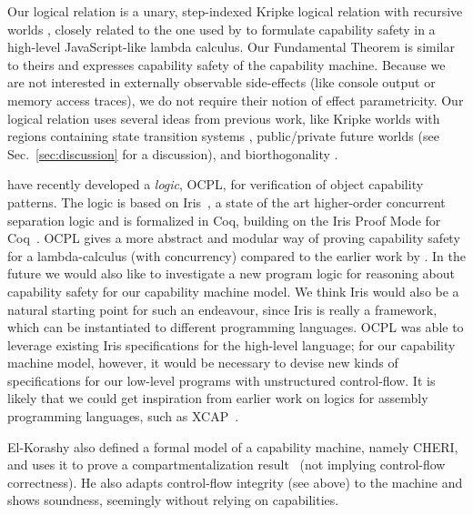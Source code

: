 \documentclass{llncs}
\newcommand{\sectionname}{Sec.}
\begin{document}
Our logical relation is a unary, step-indexed Kripke logical relation with
recursive worlds
\cite{pitts_operational_1998,Appel:2001:IMR:504709.504712,Ahmed2004semantics,Birkedal:2011:SKM:1926385.1926401},
closely related to the one used by \cite{Devriese:2016ObjCap} to formulate
capability safety in a high-level JavaScript-like lambda calculus. Our
Fundamental Theorem is similar to theirs and expresses capability safety of the
capability machine. Because we are not interested in externally observable
side-effects (like console output or memory access traces), we do not require
their notion of effect parametricity. Our logical relation uses several ideas
from previous work, like Kripke worlds with regions containing state transition
systems \cite{Ahmed:popl09}, public/private future worlds \cite{Dreyer:jfp12}
(see \sectionname~\ref{sec:discussion} for a discussion), and biorthogonality
\cite{pitts_operational_1998,benton_biorthogonality_2009-1,Hur:2011:KLR:1926385.1926402}.

\cite{swasey:2017} have recently developed a \emph{logic}, OCPL, for verification
of object capability patterns. The logic is based on
Iris~\cite{iris,iris2,iris3}, a state of the art higher-order concurrent
separation logic and is formalized in Coq, building on the Iris Proof Mode for
Coq~\cite{ipm}. OCPL gives a more abstract and modular way of proving
capability safety for a lambda-calculus (with concurrency) compared to the
earlier work by \cite{Devriese:2016ObjCap}. In the future we would also like to
investigate a new program logic for reasoning about capability safety for our
capability machine model. We think Iris would also be a natural starting point
for such an endeavour, since Iris is really a framework, which can be
instantiated to different programming languages. OCPL was able to leverage
existing Iris specifications for the high-level language; for our capability
machine model, however, it would be necessary to devise new kinds of
specifications for our low-level programs with unstructured control-flow. It is
likely that we could get inspiration from earlier work on logics for assembly
programming languages, such as XCAP~\cite{xcap}.

El-Korashy also defined a formal model of a capability machine, namely CHERI,
and uses it to prove a compartmentalization
result~\cite{akram_el-korashy_formal_2016} (not implying control-flow
correctness). He also adapts control-flow integrity (see above) to the machine
and shows soundness, seemingly without relying on capabilities.
\end{document}
